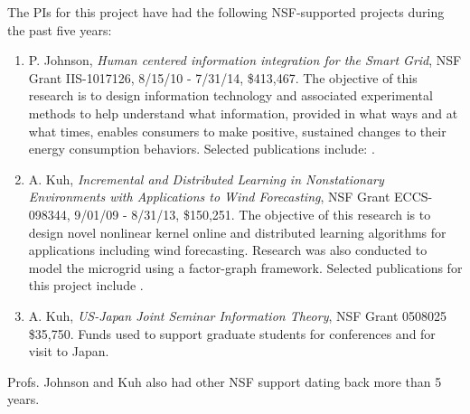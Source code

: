 The PIs for this project have had the following NSF-supported projects during the past five years:

\begin{enumerate}
\item P. Johnson, {\em Human centered information integration for the Smart Grid}, NSF
  Grant IIS-1017126, 8/15/10 - 7/31/14, \$413,467. The objective of this
  research is to design information technology and associated experimental
  methods to help understand what information, provided in what ways and at
  what times, enables consumers to make positive, sustained changes to
  their energy consumption behaviors. Selected publications include:
  \cite{csdl2-10-05,csdl2-10-07,csdl2-10-08,csdl2-11-02,csdl2-11-03,csdl2-12-06,csdl2-11-07, csdl2-12-12,csdl2-13-10,csdl2-13-05,csdl2-13-03}.
  
\vspace{-.1in}

\item A. Kuh, {\em Incremental and Distributed Learning in Nonstationary
    Environments with Applications to Wind Forecasting}, NSF Grant ECCS-098344,
  9/01/09 - 8/31/13, \$150,251.  The objective of this research is to
  design novel nonlinear kernel online and distributed learning algorithms
  for applications including wind forecasting.   Research was also conducted
  to model the microgrid using a factor-graph framework. 
  Selected publications for
  this project include \cite{kuh-etal10,kowahl-kuh,hu-etal10,hu-kuh-yang-kavcic,hu-kuh-kavcic-nakafuji,ji-wei-kuh,uddin12,kuh-isess,carland,navid}.
  

\item A. Kuh, {\em US-Japan Joint Seminar Information Theory}, NSF Grant 0508025
  \$35,750.  Funds used to support graduate students for conferences and
  for visit to Japan.

\end{enumerate}


Profs. Johnson and Kuh also had other NSF support dating back more than 5 years.


